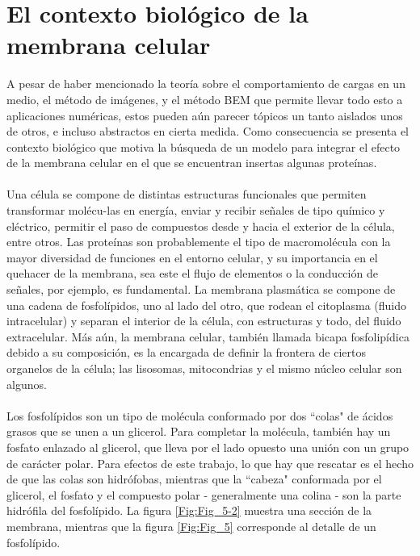 \documentclass[12pt, twoside, onehalfspace, numbers, spanish]{ezthesis}
\numberwithin{equation}{section}
\begin{document}
\section{El contexto biológico de la membrana celular}\label{Sec:Cell_Bio}
A pesar de haber mencionado la teoría sobre el comportamiento de cargas en un medio, el método de imágenes, y el método BEM que permite llevar todo esto a aplicaciones numéricas, estos pueden aún parecer tópicos un tanto aislados unos de otros, e incluso abstractos en cierta medida. Como consecuencia se presenta el contexto biológico que motiva la búsqueda de un modelo para integrar el efecto de la membrana celular en el que se encuentran insertas algunas proteínas.\\\\
Una célula se compone de distintas estructuras funcionales que permiten transformar molécu-las en energía, enviar y recibir señales de tipo químico y eléctrico, permitir el paso de compuestos desde y hacia el exterior de la célula, entre otros. Las proteínas son probablemente el tipo de macromolécula con la mayor diversidad de funciones en el entorno celular, y su importancia en el quehacer de la membrana, sea este el flujo de elementos o la conducción de señales, por ejemplo, es fundamental. La membrana plasmática se compone de una cadena de fosfolípidos, uno al lado del otro, que rodean el citoplasma (fluido intracelular) y separan el interior de la célula, con estructuras y todo, del fluido extracelular. Más aún, la membrana celular, también llamada bicapa fosfolipídica debido a su composición, es la encargada de definir la frontera de ciertos organelos de la célula; las lisosomas, mitocondrias y el mismo núcleo celular son algunos.\\\\
Los fosfolípidos son un tipo de molécula conformado por dos ``colas" de ácidos grasos que se unen a un glicerol. Para completar la molécula, también hay un fosfato enlazado al glicerol, que lleva por el lado opuesto una unión con un grupo de carácter polar. Para efectos de este trabajo, lo que hay que rescatar es el hecho de que las colas son hidrófobas, mientras que la ``cabeza" conformada por el glicerol, el fosfato y el compuesto polar - generalmente una colina - son la parte hidrófila del fosfolípido. La figura \ref{Fig:Fig_5-2} muestra una sección de la membrana, mientras que la figura \ref{Fig:Fig_5} corresponde al detalle de un fosfolípido.
\end{document}

